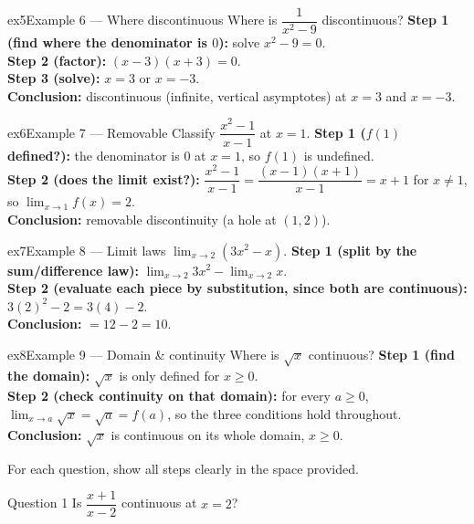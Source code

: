 \documentclass[11pt]{article}
\begin{document}
\begin{example}{ex5}{Example 6 --- Where discontinuous}
Where is $\dfrac1{x^2-9}$ discontinuous?\soln
\textbf{Step 1 (find where the denominator is $0$):} solve $x^2-9=0$.\\[3pt]
\textbf{Step 2 (factor):} $(x-3)(x+3)=0$.\\[3pt]
\textbf{Step 3 (solve):} $x=3$ or $x=-3$.\\[3pt]
\textbf{Conclusion:} discontinuous (infinite, vertical asymptotes) at $x=3$ and $x=-3$.
\end{example}

\begin{example}{ex6}{Example 7 --- Removable}
Classify $\dfrac{x^2-1}{x-1}$ at $x=1$.\soln
\textbf{Step 1 ($f(1)$ defined?):} the denominator is $0$ at $x=1$, so $f(1)$ is undefined.\\[3pt]
\textbf{Step 2 (does the limit exist?):} $\dfrac{x^2-1}{x-1}=\dfrac{(x-1)(x+1)}{x-1}=x+1$ for $x\ne1$, so $\lim_{x\to1}f(x)=2$.\\[3pt]
\textbf{Conclusion:} removable discontinuity (a hole at $(1,2)$).
\end{example}

\begin{example}{ex7}{Example 8 --- Limit laws}
$\displaystyle\lim_{x\to2}(3x^2-x)$.\soln
\textbf{Step 1 (split by the sum/difference law):} $\lim_{x\to2}3x^2-\lim_{x\to2}x$.\\[3pt]
\textbf{Step 2 (evaluate each piece by substitution, since both are continuous):} $3(2)^2-2=3(4)-2$.\\[3pt]
\textbf{Conclusion:} $=12-2=10$.
\end{example}

\begin{example}{ex8}{Example 9 --- Domain \& continuity}
Where is $\sqrt{x}$ continuous?\soln
\textbf{Step 1 (find the domain):} $\sqrt{x}$ is only defined for $x\ge0$.\\[3pt]
\textbf{Step 2 (check continuity on that domain):} for every $a\ge0$, $\lim_{x\to a}\sqrt{x}=\sqrt{a}=f(a)$, so the three conditions hold throughout.\\[3pt]
\textbf{Conclusion:} $\sqrt{x}$ is continuous on its whole domain, $x\ge0$.
\end{example}

\clearpage
{}
For each question, show all steps clearly in the space provided.

\begin{qbox}{Question 1}
Is $\dfrac{x+1}{x-2}$ continuous at $x=2$?\workspace{2.4cm}
\end{qbox}
\end{document}
